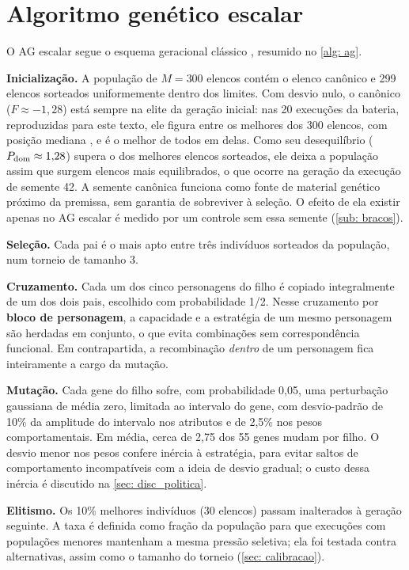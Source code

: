 \section{Algoritmo genético escalar}
\label{sec: ag_escalar}

O AG escalar segue o esquema geracional clássico \cite{goldberg1989genetic, eiben2015introduction}, resumido no \autoref{alg: ag}.

\textbf{Inicialização.} A população de $M = 300$ elencos contém o elenco canônico e 299 elencos sorteados uniformemente dentro dos limites. Com desvio nulo, o canônico ($F \approx -1{,}28$) está sempre na elite da geração inicial: nas 20 execuções da bateria, reproduzidas para este texto, ele figura entre os \canonRankMax{} melhores dos 300 elencos, com posição mediana \canonRankMed{}, e é o melhor de todos em \canonMelhorN{} delas. Como seu desequilíbrio ($P_{\mathrm{dom}} \approx 1{,}28$) supera o dos melhores elencos sorteados, ele deixa a população assim que surgem elencos mais equilibrados, o que ocorre na geração \canonSaiGer{} da execução de semente 42. A semente canônica funciona como fonte de material genético próximo da premissa, sem garantia de sobreviver à seleção. O efeito de ela existir apenas no AG escalar é medido por um controle sem essa semente (\autoref{sub: bracos}).

\textbf{Seleção.} Cada pai é o mais apto entre três indivíduos sorteados da população, num torneio de tamanho 3.

\textbf{Cruzamento.} Cada um dos cinco personagens do filho é copiado integralmente de um dos dois pais, escolhido com probabilidade 1/2. Nesse cruzamento por \textbf{bloco de personagem}, a capacidade e a estratégia de um mesmo personagem são herdadas em conjunto, o que evita combinações sem correspondência funcional. Em contrapartida, a recombinação \textit{dentro} de um personagem fica inteiramente a cargo da mutação.

\textbf{Mutação.} Cada gene do filho sofre, com probabilidade 0,05, uma perturbação gaussiana de média zero, limitada ao intervalo do gene, com desvio-padrão de 10\% da amplitude do intervalo nos atributos e de 2,5\% nos pesos comportamentais. Em média, cerca de 2,75 dos 55 genes mudam por filho. O desvio menor nos pesos confere inércia à estratégia, para evitar saltos de comportamento incompatíveis com a ideia de desvio gradual; o custo dessa inércia é discutido na \autoref{sec: disc_politica}.

\textbf{Elitismo.} Os 10\% melhores indivíduos (30 elencos) passam inalterados à geração seguinte. A taxa é definida como fração da população para que execuções com populações menores mantenham a mesma pressão seletiva; ela foi testada contra alternativas, assim como o tamanho do torneio (\autoref{sec: calibracao}).

